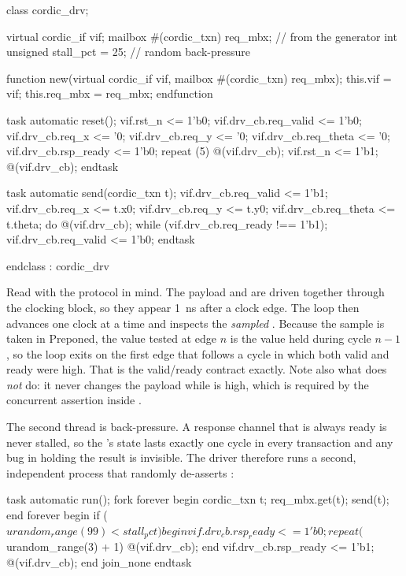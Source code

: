 \begin{svcode}[caption={The driver from \file{tb\_cordic\_pkg.sv}},label={lst:tb:drv}]
class cordic_drv;

  virtual cordic_if vif;
  mailbox #(cordic_txn) req_mbx;      // from the generator
  int unsigned stall_pct = 25;        // random back-pressure

  function new(virtual cordic_if vif, mailbox #(cordic_txn) req_mbx);
    this.vif     = vif;
    this.req_mbx = req_mbx;
  endfunction

  task automatic reset();
    vif.rst_n              <= 1'b0;
    vif.drv_cb.req_valid   <= 1'b0;
    vif.drv_cb.req_x       <= '0;
    vif.drv_cb.req_y       <= '0;
    vif.drv_cb.req_theta   <= '0;
    vif.drv_cb.rsp_ready   <= 1'b0;
    repeat (5) @(vif.drv_cb);
    vif.rst_n <= 1'b1;
    @(vif.drv_cb);
  endtask

  task automatic send(cordic_txn t);
    vif.drv_cb.req_valid <= 1'b1;
    vif.drv_cb.req_x     <= t.x0;
    vif.drv_cb.req_y     <= t.y0;
    vif.drv_cb.req_theta <= t.theta;
    do @(vif.drv_cb); while (vif.drv_cb.req_ready !== 1'b1);
    vif.drv_cb.req_valid <= 1'b0;
  endtask

endclass : cordic_drv
\end{svcode}

Read  with the protocol in mind. The payload and
 are driven together through the clocking block, so they
appear \SI{1}{\nano\second} after a clock edge. The loop then advances one
clock at a time and inspects the \emph{sampled} . Because the
sample is taken in Preponed, the value tested at edge $n$ is the value
 held during cycle $n-1$, so the loop exits on the first edge
that follows a cycle in which both valid and ready were high. That is the
valid/ready contract exactly. Note also what  does \emph{not} do:
it never changes the payload while  is high, which is required
by the concurrent assertion  inside .

The second thread is back-pressure. A response channel that is always ready is
never stalled, so the \DUT{}'s  state lasts exactly one cycle in
every transaction and any bug in holding the result is invisible. The driver
therefore runs a second, independent process that randomly de-asserts
:

\begin{svcode}[caption={Two independent driver threads},label={lst:tb:drvrun}]
task automatic run();
  fork
    forever begin
      cordic_txn t;
      req_mbx.get(t);
      send(t);
    end
    forever begin
      if ($urandom_range(99) < stall_pct) begin
        vif.drv_cb.rsp_ready <= 1'b0;
        repeat ($urandom_range(3) + 1) @(vif.drv_cb);
      end
      vif.drv_cb.rsp_ready <= 1'b1;
      @(vif.drv_cb);
    end
  join_none
endtask
\end{svcode}

